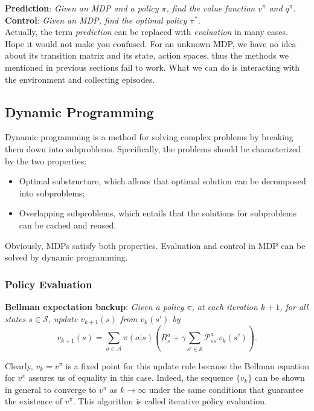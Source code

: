 \documentclass{progartcn}
\begin{document}
		\textbf{Prediction}: \textit{Given an MDP and a policy $\pi$, find the value function $v^\pi$ and $q^\pi$}.\\

		\textbf{Control}: \textit{Given an MDP, find the optimal policy $\pi^\ast$}.\\

		Actually, the term \textit{prediction} can be replaced with \textit{evaluation} in many cases. Hope it would not make you confused. For an unknown MDP, we have no idea about its transition matrix and its state, action spaces, thus the methods we mentioned in previous sections fail to work. What we can do is interacting with the environment and collecting episodes.\\

	\subsection{Dynamic Programming}

		Dynamic programming is a method for solving complex problems by breaking them down into subproblems. Specifically, the problems should be characterized by the two properties:
		\begin{itemize}[noitemsep,topsep=0pt]
			\item Optimal substructure, which allows that optimal solution can be decomposed into subproblems;
			\item Overlapping subproblems, which entails that the solutions for subproblems can be cached and reused.
		\end{itemize}

		Obviously, MDPs satisfy both properties. Evaluation and control in MDP can be solved by dynamic programming.\\

	\subsubsection{Policy Evaluation}

		\textbf{Bellman expectation backup}: \textit{Given a policy $\pi$, at each iteration $k+1$, for all states $s\in \mathcal{S}$, update $v_{k+1}(s)$ from $v_k(s')$ by}
		\[v_{k+1}(s)=\sum_{a\in\mathcal{A}}\pi(a|s)\left(R_s^a+\gamma\sum_{s'\in\mathcal{S}}\mathcal{P}_{ss'}^a v_k(s')\right).\]

		Clearly, $v_k = v^\pi$ is a fixed point for this update rule because the Bellman equation for $v^\pi$ assures us of equality in this case. Indeed, the sequence $\{v_k\}$ can be shown in general to converge to $v^\pi$ as $k\to\infty$ under the same conditions that guarantee the existence of $v^\pi$. This algorithm is called iterative policy evaluation.\\
\end{document}
